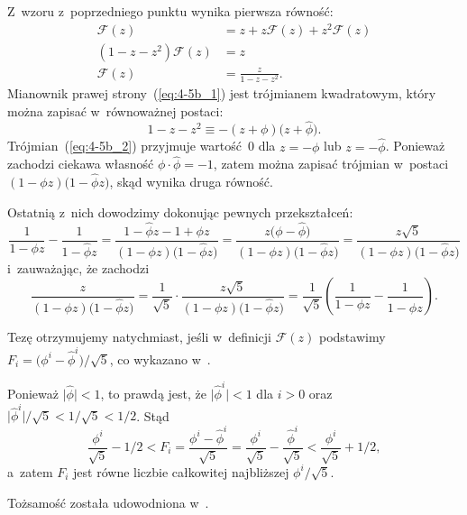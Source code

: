 \subproblem %
Z~wzoru z~poprzedniego punktu wynika pierwsza równość:
\begin{align*}
	\mathcal{F}(z) &= z+z\mathcal{F}(z)+z^2\mathcal{F}(z) \\
	(1-z-z^2)\mathcal{F}(z) &= z \\
	\mathcal{F}(z) &= \frac{z}{1-z-z^2}. \tag{$*$}\label{eq:4-5b_1}
\end{align*}
Mianownik prawej strony~(\ref{eq:4-5b_1}) jest trójmianem kwadratowym, który można zapisać w~równoważnej postaci:
\[
	1-z-z^2 \equiv -(z+\phi)\bigl(z+\widehat\phi\bigr). \tag{$*$}\label{eq:4-5b_2}
\]
Trójmian~(\ref{eq:4-5b_2}) przyjmuje wartość~0 dla $z=-\phi$ lub $z=-\widehat\phi$. Ponieważ zachodzi ciekawa własność $\phi\cdot\widehat\phi=-1$, zatem można zapisać trójmian w~postaci $(1-\phi z)\bigl(1-\widehat\phi z\bigr)$, skąd wynika druga równość.

Ostatnią z~nich dowodzimy dokonując pewnych przekształceń:
\[
	\frac{1}{1-\phi z}-\frac{1}{1-\widehat\phi z} = \frac{1-\widehat\phi z-1+\phi z}{(1-\phi z)\bigl(1-\widehat\phi z\bigr)} = \frac{z\bigl(\phi-\widehat\phi\bigr)}{(1-\phi z)\bigl(1-\widehat\phi z\bigr)} = \frac{z\sqrt{5}}{(1-\phi z)\bigl(1-\widehat\phi z\bigr)}
\]
i~zauważając, że zachodzi
\[
	\frac{z}{(1-\phi z)\bigl(1-\widehat\phi z\bigr)} = \frac{1}{\sqrt{5}}\cdot\frac{z\sqrt{5}}{(1-\phi z)\bigl(1-\widehat\phi z\bigr)} = \frac{1}{\sqrt{5}}\left(\frac{1}{1-\phi z}-\frac{1}{1-\widehat\phi z}\right).
\]

\subproblem %
Tezę otrzymujemy natychmiast, jeśli w~definicji $\mathcal{F}(z)$ podstawimy $F_i=\bigl(\phi^i-\widehat\phi^i\bigr)/\sqrt{5}$, co wykazano w~.

\subproblem %
Ponieważ $\bigl|\widehat\phi\bigr|<1$, to prawdą jest, że $\bigl|\widehat\phi^i\bigr|<1$ dla $i>0$ oraz $\bigl|\widehat\phi^i\bigr|/\sqrt{5}<1/\sqrt{5}<1/2$. Stąd
\[
	\frac{\phi^i}{\sqrt{5}}-1/2 < F_i = \frac{\phi^i-\widehat\phi^i}{\sqrt{5}} = \frac{\phi^i}{\sqrt{5}}-\frac{\widehat\phi^i}{\sqrt{5}} < \frac{\phi^i}{\sqrt{5}}+1/2,
\]
a~zatem $F_i$ jest równe liczbie całkowitej najbliższej $\phi^i/\sqrt{5}$.

\subproblem %
Tożsamość została udowodniona w~.


